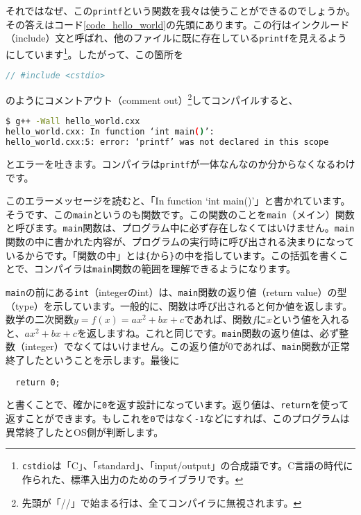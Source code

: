 それではなぜ、この\texttt{printf}という関数を我々は使うことができるのでしょうか。その答えはコード\ref{code_hello_world}の先頭にあります。この行はインクルード（include）文と呼ばれ、他のファイルに既に存在している\texttt{printf}を見えるようにしています\footnote{\texttt{cstdio}は「C」、「standard」、「input/output」の合成語です。C言語の時代に作られた、標準入出力のためのライブラリです。}。したがって、この箇所を
\begin{lstlisting}[language=c++]
// #include <cstdio>
\end{lstlisting}
のようにコメントアウト（comment out）\footnote{先頭が「//」で始まる行は、全てコンパイラに無視されます。}してコンパイルすると、
\begin{lstlisting}[language=bash]
$ g++ -Wall hello_world.cxx
hello_world.cxx: In function ‘int main()’:
hello_world.cxx:5: error: ‘printf’ was not declared in this scope
\end{lstlisting}
とエラーを吐きます。コンパイラは\texttt{printf}が一体なんなのか分からなくなるわけです。

このエラーメッセージを読むと、「In function `int main()'」と書かれています。そうです、この\texttt{main}というのも関数です。この関数のことを\texttt{main}（メイン）関数と呼びます。\texttt{main}関数は、プログラム中に必ず存在しなくてはいけません。\texttt{main}関数の中に書かれた内容が、プログラムの実行時に呼び出される決まりになっているからです。「関数の中」とは\texttt{\{}から\texttt{\}}の中を指しています。この括弧を書くことで、コンパイラは\texttt{main}関数の範囲を理解できるようになります。

\texttt{main}の前にある\texttt{int}（integerのint）は、\texttt{main}関数の返り値（return value）の型（type）を示しています。一般的に、関数は呼び出されると何か値を返します。数学の二次関数$y=f(x)=ax^2+bx+c$であれば、関数$f$に$x$という値を入れると、$ax^2+bx+c$を返しますね。これと同じです。\texttt{main}関数の返り値は、必ず整数（integer）でなくてはいけません。この返り値が0であれば、\texttt{main}関数が正常終了したということを示します。最後に
\begin{lstlisting}
  return 0; 
\end{lstlisting}
と書くことで、確かに\texttt{0}を返す設計になっています。返り値は、\texttt{return}を使って返すことができます。もしこれを\texttt{0}ではなく\texttt{-1}などにすれば、このプログラムは異常終了したとOS側が判断します。

